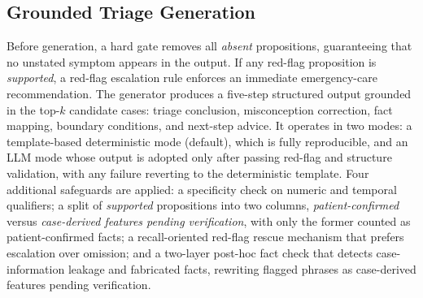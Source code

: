 \subsection{Grounded Triage Generation}

Before generation, a hard gate removes all \textit{absent} propositions, guaranteeing that no unstated symptom appears in the output. If any red-flag proposition is \textit{supported}, a red-flag escalation rule enforces an immediate emergency-care recommendation. The generator produces a five-step structured output grounded in the top-$k$ candidate cases: triage conclusion, misconception correction, fact mapping, boundary conditions, and next-step advice. It operates in two modes: a template-based deterministic mode (default), which is fully reproducible, and an LLM mode whose output is adopted only after passing red-flag and structure validation, with any failure reverting to the deterministic template. Four additional safeguards are applied: a specificity check on numeric and temporal qualifiers; a split of \textit{supported} propositions into two columns, \textit{patient-confirmed} versus \textit{case-derived features pending verification}, with only the former counted as patient-confirmed facts; a recall-oriented red-flag rescue mechanism that prefers escalation over omission; and a two-layer post-hoc fact check that detects case-information leakage and fabricated facts, rewriting flagged phrases as case-derived features pending verification.

